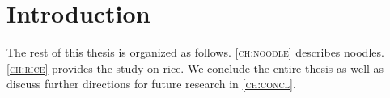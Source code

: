 \chapter{Introduction}
\label{ch:intro}

\lipsum[1]

The rest of this thesis is organized as follows.
\textsc{\autoref{ch:noodle}} describes noodles.
\textsc{\autoref{ch:rice}} provides the study on rice.
We conclude the entire thesis as well as discuss further directions for future research in \textsc{\autoref{ch:concl}}.

